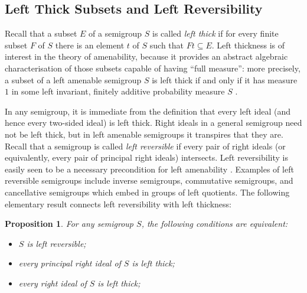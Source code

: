 \documentclass[11pt,a4paper,reqno]{amsart}
\newtheorem{proposition}[theorem]{Proposition}
\begin{document}
\subsection{Left Thick Subsets and Left Reversibility}

Recall that a subset $E$ of a semigroup $S$ is called \textit{left thick} if
for every finite subset $F$ of $S$ there is an element $t$ of $S$ such that
$Ft \subseteq E$. Left thickness is of interest in the theory of
amenability, because it provides an abstract algebraic characterisation of those
subsets capable of having ``full measure'': more precisely, a subset
of a left amenable semigroup $S$ is left thick if and only if it has measure $1$
in some left invariant, finitely additive probability measure $S$ \cite[Proposition~2.1]{Paterson88}.

In any semigroup, it is immediate from the definition that every left ideal (and
hence 
every two-sided ideal) is left thick. Right ideals in a general semigroup
need not be left thick, but in left amenable semigroups it transpires that
they are. Recall that a semigroup is called \textit{left reversible} if every pair
of right ideals (or equivalently, every pair of principal right ideals)
intersects.
Left reversibility is easily seen to be a necessary precondition
for left amenability \cite[Proposition 1.23]{Paterson88}.
Examples of left reversible semigroups include inverse semigroups, commutative semigroups, and cancellative semigroups which embed in groups of left quotients.
The following elementary result connects left reversibility with left thickness:
\begin{proposition}\label{prop_reversiblethick}
For any semigroup $S$, the following conditions are equivalent:
\begin{itemize}
\item[(i)] $S$ is left reversible;
\item[(ii)] every principal right ideal of $S$ is left thick;
\item[(iii)] every right ideal of $S$ is left thick;
\end{itemize}
\end{proposition}
\end{document}
